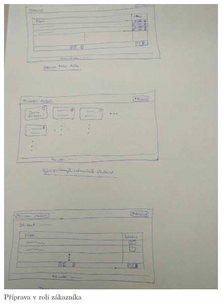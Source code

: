 \documentclass[a4paper, 11pt]{article}
\begin{document}
	\begin{figure}[ht]
		\centering
		\includegraphics[width=0.98\linewidth]{priprava_v_roli_zakaznika_2.jpg}
		\caption{Příprava v roli zákazníka}
	\end{figure}
\end{document}
